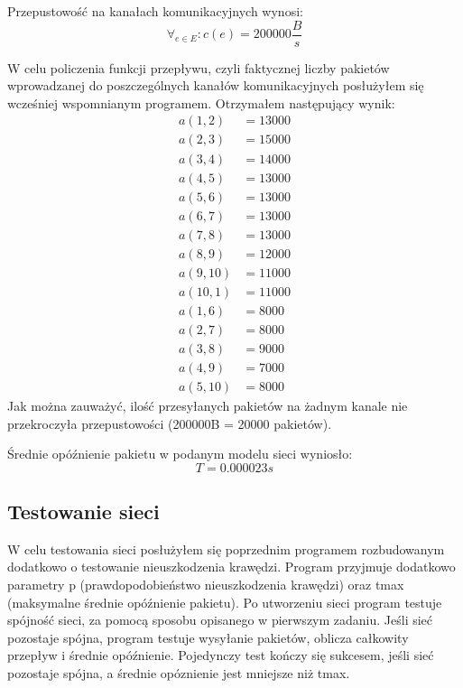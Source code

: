 \documentclass[titlepage]{article}
\begin{document}
Przepustowość na kanałach komunikacyjnych wynosi:
\begin{equation*}
	\forall_{e\in E}: c(e) = 200000\frac{B}{s}
\end{equation*}

W celu policzenia funkcji przepływu, czyli faktycznej liczby pakietów wprowadzanej do poszczególnych kanałów komunikacyjnych posłużyłem się wcześniej wspomnianym programem. Otrzymałem następujący wynik:
\begin{align*}
	a(1, 2) &= 13000 \\
	a(2, 3) &= 15000 \\
	a(3, 4) &= 14000 \\
	a(4, 5) &= 13000 \\
	a(5, 6) &= 13000 \\
	a(6, 7) &= 13000 \\
	a(7, 8) &= 13000 \\
	a(8, 9) &= 12000 \\
	a(9, 10) &= 11000 \\
	a(10, 1) &= 11000 \\
	a(1, 6) &= 8000 \\
	a(2, 7) &= 8000 \\
	a(3, 8) &= 9000 \\
	a(4, 9) &= 7000 \\
	a(5, 10) &= 8000 
\end{align*}
Jak można zauważyć, ilość przesyłanych pakietów na żadnym kanale nie przekroczyła przepustowości (200000B = 20000 pakietów).

Średnie opóźnienie pakietu w podanym modelu sieci wyniosło:
\begin{equation*}
	T = 0.000023 s
\end{equation*}

\subsection{Testowanie sieci}
W celu testowania sieci posłużyłem się poprzednim programem rozbudowanym dodatkowo o testowanie nieuszkodzenia krawędzi. Program przyjmuje dodatkowo parametry p (prawdopodobieństwo nieuszkodzenia krawędzi) oraz tmax (maksymalne średnie opóźnienie pakietu). Po utworzeniu sieci program testuje spójność sieci, za pomocą sposobu opisanego w pierwszym zadaniu. Jeśli sieć pozostaje spójna, program testuje wysyłanie pakietów, oblicza całkowity przepływ i średnie opóźnienie. Pojedynczy test kończy się sukcesem, jeśli sieć pozostaje spójna, a średnie opóznienie jest mniejsze niż tmax.
\end{document}
